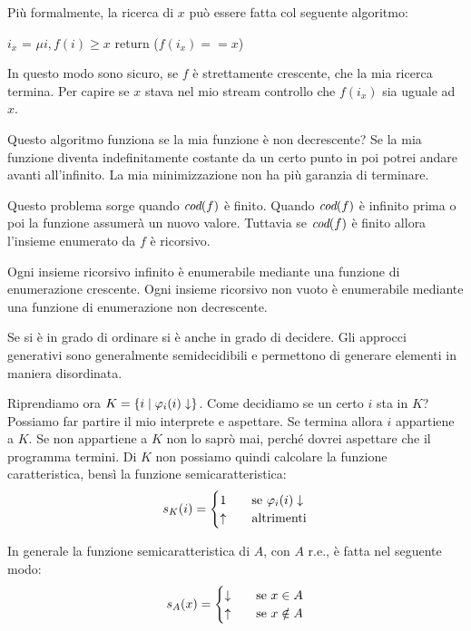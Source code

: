 Più formalmente, la ricerca di $x$ può essere fatta col seguente algoritmo:
\begin{python}
    $i_{x}$ = $\mu i, f(i) \geq x$
    return ($f(i_{x}) == x$)
\end{python}

In questo modo sono sicuro, se $f$ è strettamente crescente, che la mia ricerca termina. Per capire
se $x$ stava nel mio stream controllo che $f(i_{x})$ sia uguale ad $x$. 

Questo algoritmo funziona se la mia funzione è non decrescente? Se la mia funzione diventa
indefinitamente costante da un certo punto in poi potrei andare avanti all'infinito. La mia
minimizzazione non ha più garanzia di terminare.

Questo problema sorge quando $\textit{cod}(f)$ è finito. Quando $\textit{cod}(f)$ è infinito prima o poi la funzione
assumerà un nuovo valore. Tuttavia se $\textit{cod}(f)$ è finito allora l'insieme enumerato da $f$ è
ricorsivo.

Ogni insieme ricorsivo infinito è enumerabile mediante una funzione di enumerazione crescente. Ogni
insieme ricorsivo non vuoto è enumerabile mediante una funzione di enumerazione non decrescente.

Se si è in grado di ordinare si è anche in grado di decidere. Gli approcci generativi sono
generalmente semidecidibili e permettono di generare elementi in maniera disordinata.

Riprendiamo ora $K = \{i \mid \varphi_{i}(i) \downarrow\}$. Come decidiamo se un certo $i$ sta in $K$? Possiamo far
partire il mio interprete e aspettare. Se termina allora $i$ appartiene a $K.$ Se non appartiene a
$K$ non lo saprò mai, perché dovrei aspettare che il programma termini. Di $K$ non possiamo quindi calcolare
la funzione caratteristica, bensì la funzione semicaratteristica:
\begin{equation*}
    s_{K}(i) = 
    \begin{cases}
        1 \quad &\text{se $\varphi_{i}(i) \downarrow$} \\
        \uparrow \quad &\text{altrimenti}
    \end{cases}
\end{equation*}

In generale la funzione semicaratteristica di $A$, con $A$ r.e., è fatta nel seguente modo:
\begin{equation*}
    s_{A}(x) = 
    \begin{cases}
        \downarrow \quad &\text{se $x \in A$} \\
        \uparrow \quad &\text{se $x \notin A$}
    \end{cases}
\end{equation*}

